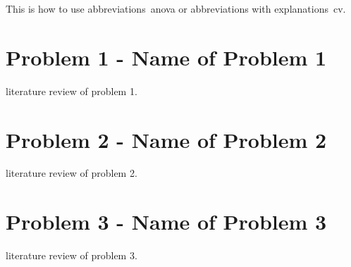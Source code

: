 This is how to use abbreviations~\gls{anova} or abbreviations with explanations~\gls{cv}.

\section{Problem 1 - Name of Problem 1}\label{sec:lit-rev-problem-1}
literature review of problem 1.

\section{Problem 2 - Name of Problem 2}\label{sec:lit-rev-problem-2}
literature review of problem 2.

\section{Problem 3 - Name of Problem 3}\label{sec:lit-rev-problem-3}
literature review of problem 3.
